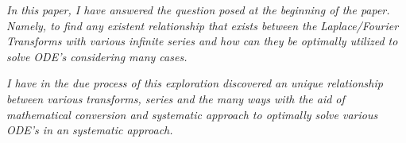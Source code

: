 \textit{In this paper, I have answered the question posed at the beginning of the paper. Namely, to find any existent relationship that exists between the Laplace/Fourier Transforms with various infinite series and how can they be optimally utilized to solve ODE's  considering many cases.}

\textit{I have in the due process of this exploration discovered an unique relationship between various transforms, series and the many ways with the aid of mathematical conversion and systematic approach to optimally solve various ODE's in an systematic approach.}

